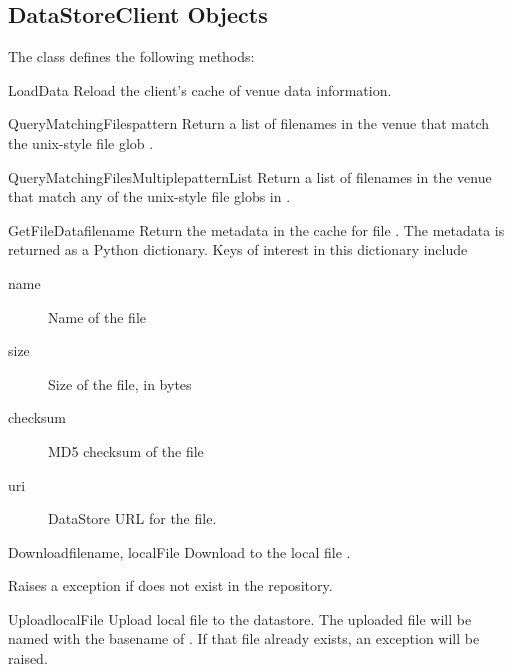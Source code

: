 \documentclass{howto}
\begin{document}
%
%


\subsection{DataStoreClient Objects}

The  class defines the following methods:

\begin{methoddesc}{LoadData}{}
Reload the client's cache of venue data information.
\end{methoddesc}

\begin{methoddesc}{QueryMatchingFiles}{pattern}
Return a list of filenames in the venue that match the unix-style file
glob .

\end{methoddesc}

\begin{methoddesc}{QueryMatchingFilesMultiple}{patternList}
Return a list of filenames in the venue that match any of the unix-style file
globs in .

\end{methoddesc}

\begin{methoddesc}{GetFileData}{filename}
Return the metadata in the cache for file . The metadata
is returned as a Python dictionary. Keys of
interest in this dictionary include 
\begin{description}
\item[name~] Name of the file
\item[size~] Size of the file, in bytes
\item[checksum~] MD5 checksum of the file
\item[uri~] DataStore URL for the file.
\end{description}

\end{methoddesc}

\begin{methoddesc}{Download}{filename, localFile}
Download  to the local file .

Raises a  exception if  does not exist
in the repository.

\end{methoddesc}

\begin{methoddesc}{Upload}{localFile}
Upload local file  to the datastore. The uploaded file will
be named with the basename of . If that file already
exists, an exception will be raised.
\end{methoddesc}
\end{document}
